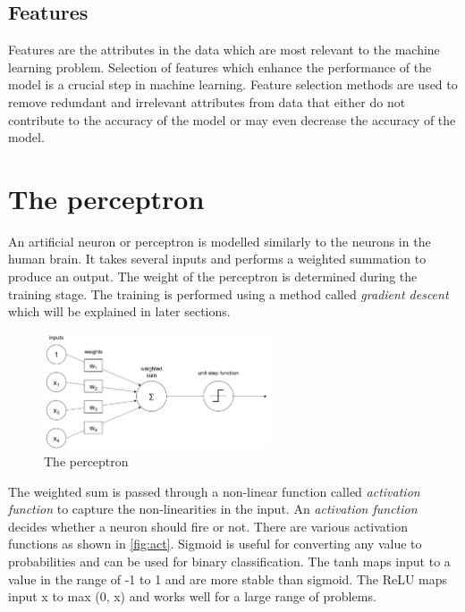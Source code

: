 \documentclass[a4paper, 12pt, oneside, BCOR1cm,toc=chapterentrywithdots]{scrbook}
\begin{document}
\subsection{Features}

Features are the attributes in the data which are most relevant to the machine learning problem. Selection of features which enhance the performance of the model is a crucial step in machine learning. Feature selection methods are used to remove redundant and irrelevant attributes from data that either do not contribute to the accuracy of the model or may even decrease the accuracy of the model. 

\section{The perceptron}
An artificial neuron or perceptron is modelled similarly to the neurons in the human brain. It takes several inputs and performs a weighted summation to produce an output. The weight of the perceptron is determined during the training stage. The training is performed using a method called \textit{gradient descent} which will be explained in later sections.  

\begin{figure}[h]
\centering
\includegraphics[width=0.6\textwidth]{image3.png}
\caption{The perceptron}
\label{fig:pic3}
\end{figure}

 The weighted sum is passed through a non-linear function called \textit{activation function} to capture the non-linearities in the input.  An \textit{activation function} decides whether a neuron should fire or not. There are various activation functions as shown in \ref{fig:act}. Sigmoid is useful for converting any value to probabilities and can be used for binary classification. The tanh maps input to a value in the range of -1 to 1 and are more stable than sigmoid. The ReLU maps input x to max (0, x) and works well for a large range of problems.
 
\end{document}
